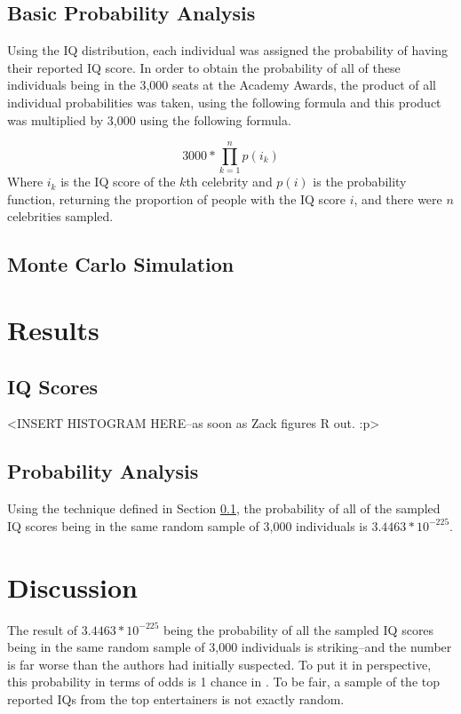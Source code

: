 \documentclass[12pt,letterpaper,titlepage,oneside,draft]{article}
\begin{document}
\subsection{Basic Probability Analysis}
\label{probanal}
Using the IQ distribution, each individual was assigned the probability of having their reported IQ score. In order to obtain the probability of all of these individuals being in the 3,000 seats at the Academy Awards, the product of all individual probabilities was taken, using the following formula and this product was multiplied by 3,000 using the following formula.

\begin{equation}
3000 * \prod_{k=1}^n p(i_k)
\end{equation}
Where $i_k$ is the IQ score of the $k$th celebrity and $p(i)$ is the probability function, returning the proportion of people with the IQ score $i$, and there were $n$ celebrities sampled.

\subsection{Monte Carlo Simulation} 

\section{Results}
\subsection{IQ Scores}
<INSERT HISTOGRAM HERE--as soon as Zack figures R out. :p>

\subsection{Probability Analysis}
Using the technique defined in Section \ref{probanal}, the probability of all of the sampled IQ scores being in the same random sample of 3,000 individuals is $3.4463 * 10^{-225}$.

\section{Discussion}
The result of $3.4463 * 10^{-225}$ being the probability of all the sampled IQ scores being in the same random sample of 3,000 individuals is striking--and the number is far worse than the authors had initially suspected. To put it in perspective, this probability in terms of odds is 1 chance in . To be fair, a sample of the top reported IQs from the top entertainers is not exactly random.
\end{document}
